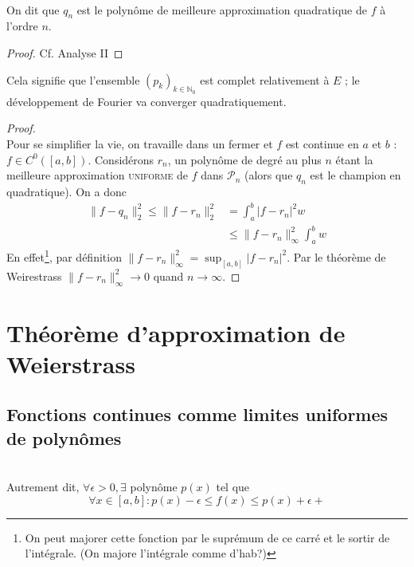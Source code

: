 	
	\ \\
	On dit que $q_n$ est le polynôme de meilleure approximation quadratique de 
	$f$ à l'ordre $n$.
	\begin{proof}
	Cf. Analyse II
	\end{proof}
	
	\theor{\ \\
	Si $]a, b[$ est \textbf{borné} (!), alors $\forall f \in E : \lim\limits_{n
	\rightarrow	\infty} \| f - q_n \|_2 = 0$}
	Cela signifie que l'ensemble $(p_k)_{k\in\mathbb{N}_0}$ est complet 
	relativement à $E$ ; le développement de Fourier va converger quadratiquement.
	
	\begin{proof}\ \\
	Pour se simplifier la vie, on travaille dans un fermer et $f$ est continue en 
	$a$ et $b$ : $f \in C^0([a,b])$. Considérons $r_n$, un polynôme de degré au 
	plus $n$ étant la meilleure approximation \textsc{uniforme} de $f$ dans 
	$\mathcal{P}_n$ (alors que $q_n$ est le champion en quadratique). On a donc
	\begin{equation}
	\begin{array}{ll}
	\|f - q_n\|_2^2 \leq \|f-r_n\|_2^2 &= \int_a^b |f-r_n|^2w\\
	 &\leq \| f-r_n\|_\infty^2\int_a^b w
	\end{array}
	\end{equation}
	En effet\footnote{On peut majorer cette fonction par le suprémum de ce carré 
	et le sortir de l’intégrale. (On majore l'intégrale comme d'hab?)}, par 
	définition $\|f-r_n\|_\infty^2 = \sup_{[a,b]} |f-r_n|^2$. Par le théorème de 
	Weirestrass $\| f - r_n\|_\infty^2 \rightarrow 0$ quand $n \rightarrow\infty$.
	\end{proof}
	



\section{Théorème d'approximation de Weierstrass}
	\subsection{Fonctions continues comme limites uniformes de polynômes}
	\ \\
	Autrement dit, $\forall \epsilon > 0, \exists$ polynôme $p(x)$ tel que 
	\begin{equation}
	\forall x \in [a,b] : p(x) - \epsilon \leq f(x) \leq p(x)+\epsilon
	+
	\end{equation}
	
